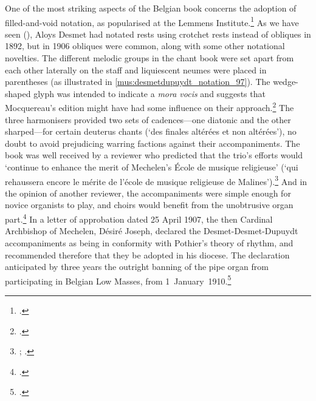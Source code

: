 One of the most striking aspects of the Belgian book concerns the adoption of filled-and-void notation, as popularised at the Lemmens Institute.\footcites[The Lemmens Institute opened new buildings on 5 November 1903 to celebrate its twenty-fifth anniversary in October. See][66]{Guillaumeproposmusiquereligieuse1906}[p.~xviii]{GodenneMalinesjadisaujourd1908}[The school's twenty-fifth anniversary has been erroneously placed in 1908 in][18]{RobijnsJaakNikolaasLemmens1981}
\label{sc:desmet_1906}%
As we have seen (), Aloys Desmet had notated rests using crotchet rests instead of obliques in 1892, but in 1906 obliques were common, along with some other notational novelties.
The different melodic groups in the chant book were set apart from each other laterally on the staff and liquiescent neumes were placed in parentheses (as illustrated in \cref{mus:desmetdupuydt_notation_97}).
The wedge-shaped glyph was intended to indicate a \emph{mora vocis} and suggests that Mocquereau's edition might have had some influence on their approach.\footcite[unpainated approbation pp.~5, 97]{DesmetCommunepluriumconfessorum1910}
The three harmonisers provided two sets of cadences---one diatonic and the other sharped---for certain deuterus chants (`des finales altérées et non altérées'), no doubt to avoid prejudicing warring factions against their accompaniments.
The book was well received by a reviewer who predicted that the trio's efforts would `continue to enhance the merit of Mechelen's École de musique religieuse' (`qui rehaussera encore le mérite de l'école de musique religieuse de Malines').\footnote{\covid{}\cite{DesmetOrganumcomitansad1906}; \cite[391]{SwolfsBulletinbibliographiqueinternational1906}.}
And in the opinion of another reviewer, the accompaniments were simple enough for novice organists to play, and choirs would benefit from the unobtrusive organ part.\footcite[117]{Bibliographiegregorienneeditions1906a}
In a letter of approbation dated 25 April 1907, the then Cardinal Archbishop of Mechelen, Désiré Joseph, declared the Desmet-Desmet-Dupuydt accompaniments as being in conformity with Pothier's theory of rhythm, and recommended therefore that they be adopted in his diocese.
The declaration anticipated by three years the outright banning of the pipe organ from participating in Belgian Low Masses, from 1~January~1910.\footcite[80]{NouvellesmusicalesBelgique1910}

